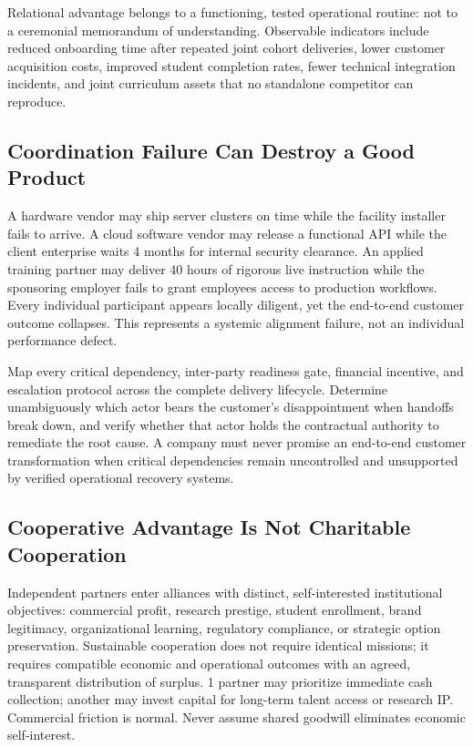 Relational advantage belongs to a functioning, tested operational routine: not to a ceremonial memorandum of understanding. Observable indicators include reduced onboarding time after repeated joint cohort deliveries, lower customer acquisition costs, improved student completion rates, fewer technical integration incidents, and joint curriculum assets that no standalone competitor can reproduce.

\subsection{Coordination Failure Can Destroy a Good Product}
\label{sec:coordination_failure_risks}

A hardware vendor may ship server clusters on time while the facility installer fails to arrive. A cloud software vendor may release a functional API while the client enterprise waits 4 months for internal security clearance. An applied training partner may deliver 40 hours of rigorous live instruction while the sponsoring employer fails to grant employees access to production workflows. Every individual participant appears locally diligent, yet the end-to-end customer outcome collapses. This represents a systemic alignment failure, not an individual performance defect.

Map every critical dependency, inter-party readiness gate, financial incentive, and escalation protocol across the complete delivery lifecycle. Determine unambiguously which actor bears the customer's disappointment when handoffs break down, and verify whether that actor holds the contractual authority to remediate the root cause. A company must never promise an end-to-end customer transformation when critical dependencies remain uncontrolled and unsupported by verified operational recovery systems.

\subsection{Cooperative Advantage Is Not Charitable Cooperation}
\label{sec:cooperative_advantage_commercial_realism}

Independent partners enter alliances with distinct, self-interested institutional objectives: commercial profit, research prestige, student enrollment, brand legitimacy, organizational learning, regulatory compliance, or strategic option preservation. Sustainable cooperation does not require identical missions; it requires compatible economic and operational outcomes with an agreed, transparent distribution of surplus. 1 partner may prioritize immediate cash collection; another may invest capital for long-term talent access or research IP. Commercial friction is normal. Never assume shared goodwill eliminates economic self-interest.


